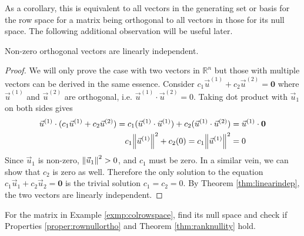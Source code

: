 As a corollary, this is equivalent to all vectors in the generating set or basis for the row space for a matrix being orthogonal to all vectors in those for its null space. The following additional observation will be useful later.
\begin{proper}
\label{proper:ortholinind}
Non-zero orthogonal vectors are linearly independent.
\end{proper}
\begin{proof}
We will only prove the case with two vectors in $\mathbb{R}^n$ but those with multiple vectors can be derived in the same essence. Consider $c_1\vec{u}^{(1)} + c_2\vec{u}^{(2)} = \textbf{0}$ where $\vec{u}^{(1)}$ and $\vec{u}^{(2)}$ are orthogonal, i.e. $\vec{u}^{(1)} \cdot \vec{u}^{(2)} = 0$. Taking dot product with $\vec{u}_1$ on both sides gives
\begin{align*}
\vec{u}^{(1)} \cdot (c_1\vec{u}^{(1)} + c_2\vec{u}^{(2)}) = c_1(\vec{u}^{(1)} \cdot \vec{u}^{(1)}) + c_2(\vec{u}^{(1)} \cdot \vec{u}^{(2)}) &= \vec{u}^{(1)} \cdot \textbf{0} \\
c_1 \norm{\vec{u}^{(1)}}^2 + c_2 (0) = c_1 \norm{\vec{u}^{(1)}}^2 &= 0
\end{align*}
Since $\vec{u}_1$ is non-zero, $\norm{\vec{u}_1}^2 > 0$, and $c_1$ must be zero. In a similar vein, we can show that $c_2$ is zero as well. Therefore the only solution to the equation $c_1\vec{u}_1 + c_2\vec{u}_2 = \textbf{0}$ is the trivial solution $c_1 = c_2 = 0$. By Theorem \ref{thm:linearindep}, the two vectors are linearly independent.
\end{proof}
\begin{exmp}
\label{exmp:colrowspace2}
For the matrix in Example \ref{exmp:colrowspace}, find its null space and check if Properties \ref{proper:rownullortho} and Theorem \ref{thm:ranknullity} hold.
\end{exmp}
